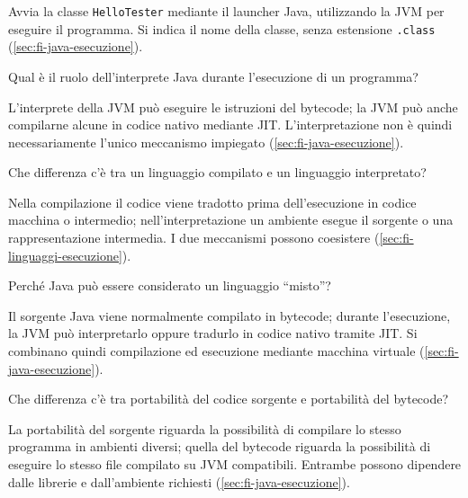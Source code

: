 Avvia la classe \texttt{HelloTester} mediante il launcher Java, utilizzando la
JVM per eseguire il programma. Si indica il nome della classe, senza estensione
\texttt{.class} (\cref{sec:fi-java-esecuzione}).

\begin{exercise}
\label{ex:fi-esercizi-introduzione-java-interprete-ruolo}
Qual è il ruolo dell'interprete Java durante l'esecuzione di un programma?
\end{exercise}

L'interprete della JVM può eseguire le istruzioni del bytecode; la JVM può anche
compilarne alcune in codice nativo mediante JIT. L'interpretazione non è quindi
necessariamente l'unico meccanismo impiegato (\cref{sec:fi-java-esecuzione}).

\begin{exercise}
\label{ex:fi-esercizi-introduzione-java-compilato-interpretato}
Che differenza c'è tra un linguaggio compilato e un linguaggio interpretato?
\end{exercise}

Nella compilazione il codice viene tradotto prima dell'esecuzione in codice
macchina o intermedio; nell'interpretazione un ambiente esegue il sorgente o una
rappresentazione intermedia. I due meccanismi possono coesistere
(\cref{sec:fi-linguaggi-esecuzione}).

\begin{exercise}
\label{ex:fi-esercizi-introduzione-java-java-misto}
Perché Java può essere considerato un linguaggio ``misto''?
\end{exercise}

Il sorgente Java viene normalmente compilato in bytecode; durante l'esecuzione,
la JVM può interpretarlo oppure tradurlo in codice nativo tramite JIT. Si
combinano quindi compilazione ed esecuzione mediante macchina virtuale
(\cref{sec:fi-java-esecuzione}).

\begin{exercise}
\label{ex:fi-esercizi-introduzione-java-portabilita-sorgente-bytecode}
Che differenza c'è tra portabilità del codice sorgente e portabilità del bytecode?
\end{exercise}

La portabilità del sorgente riguarda la possibilità di compilare lo stesso
programma in ambienti diversi; quella del bytecode riguarda la possibilità di
eseguire lo stesso file compilato su JVM compatibili. Entrambe possono dipendere
dalle librerie e dall'ambiente richiesti (\cref{sec:fi-java-esecuzione}).


